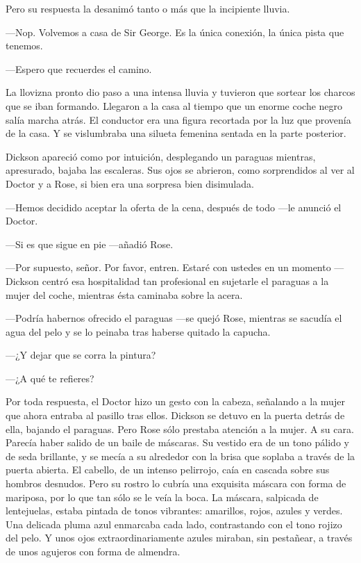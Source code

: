 {Pero su respuesta la desanimó tanto o más que la incipiente lluvia.}

{---Nop. Volvemos a casa de Sir George. Es la única conexión, la única
pista que tenemos.}

{---Espero que recuerdes el camino.}

{La llovizna pronto dio paso a una intensa lluvia y tuvieron que sortear
	los charcos que se iban formando. Llegaron a la casa al tiempo que un
	enorme coche negro salía marcha atrás. El conductor era una figura
	recortada por la luz que provenía de la casa. Y se vislumbraba una
silueta femenina sentada en la parte posterior.}

{Dickson apareció como por intuición, desplegando un paraguas mientras,
	apresurado, bajaba las escaleras. Sus ojos se abrieron, como
	sorprendidos al ver al Doctor y a Rose, si bien era una sorpresa bien
disimulada.}

{---Hemos decidido aceptar la oferta de la cena, después de todo ---le
anunció el Doctor.}

{---Si es que sigue en pie ---añadió Rose.}

{---Por supuesto, señor. Por favor, entren. Estaré con ustedes en un
	momento ---Dickson centró esa hospitalidad tan profesional en sujetarle
	el paraguas a la mujer del coche, mientras ésta caminaba sobre la
acera.}

{---Podría habernos ofrecido el paraguas ---se quejó Rose, mientras se
	sacudía el agua del pelo y se lo peinaba tras haberse quitado la
capucha.}

{---¿Y dejar que se corra la pintura?}

{---¿A qué te refieres?}

{Por toda respuesta, el Doctor hizo un gesto con la cabeza, señalando a
	la mujer que ahora entraba al pasillo tras ellos. Dickson se detuvo en
	la puerta detrás de ella, bajando el paraguas. Pero Rose sólo prestaba
	atención a la mujer. A su cara. Parecía haber salido de un baile de
	máscaras. Su vestido era de un tono pálido y de seda brillante, y se
	mecía a su alrededor con la brisa que soplaba a través de la puerta
	abierta. El cabello, de un intenso pelirrojo, caía en cascada sobre sus
	hombros desnudos. Pero su rostro lo cubría una exquisita máscara con
	forma de mariposa, por lo que tan sólo se le veía la boca. La máscara,
	salpicada de lentejuelas, estaba pintada de tonos vibrantes: amarillos,
	rojos, azules y verdes. Una delicada pluma azul enmarcaba cada lado,
	contrastando con el tono rojizo del pelo. Y unos ojos
	extraordinariamente azules miraban, sin pestañear, a través de unos
agujeros con forma de almendra.}

